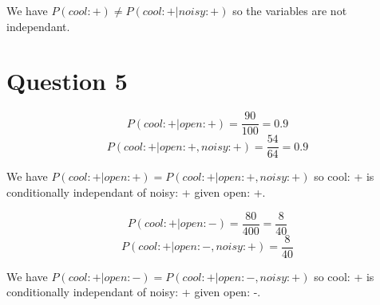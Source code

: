 \documentclass[10pt]{article}
\begin{document}
We have $P(cool: +) \neq P(cool: +|noisy: +)$ so the variables are not independant.

\section*{Question 5}
\begin{equation}
    P(cool: +| open: +) = \frac{90}{100} = 0.9
\end{equation}
\begin{equation}
    P(cool: +| open: +, noisy: +) = \frac{54}{64} = 0.9
\end{equation}

We have $P(cool: +| open: +) = P(cool: +| open: +, noisy: +)$ so
cool: + is conditionally independant of noisy: + given open: +.


\begin{equation}
    P(cool: +| open: -) = \frac{80}{400} = \frac{8}{40}
\end{equation}
\begin{equation}
    P(cool: +| open: -, noisy: +) = \frac{8}{40}
\end{equation}

We have $P(cool: +| open: -) = P(cool: +| open: -, noisy: +)$ so
cool: + is conditionally independant of noisy: + given open: -.
\end{document}
